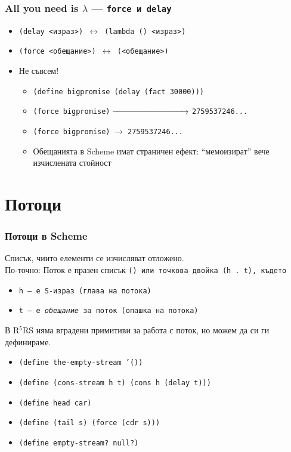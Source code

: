 \documentclass{beamer}
\begin{document}
\begin{frame}
  \frametitle{All you need is $\lambda$ --- \tt{force} и \tt{delay}}
  \begin{itemize}
  \item \tt{(delay }<израз>\tt) $\leftrightarrow$ \tt{(lambda () <израз>)}
  \item \tt{(force }<обещание>\tt) $\leftrightarrow$ \tt{(<обещание>)}\pause
  \item \alert{Не съвсем!} \pause
    \begin{itemize}[<.->]
    \item \tt{(define bigpromise (delay (fact 30000)))}
    \item \tt{(force bigpromise)}$\;\xrightarrow{\hspace*{3cm}}\;$\tt{2759537246...}
    \item \tt{(force bigpromise)}$\;\rightarrow\;$\tt{2759537246...} \pause
    \item Обещанията в Scheme имат страничен ефект: ``мемоизират'' вече изчислената стойност
    \end{itemize}
  \end{itemize}
\end{frame}

\section{Потоци}

\begin{frame}
  \frametitle{Потоци в Scheme}
  \begin{definition}[Поток]
    Списък, чиито елементи се изчисляват отложено. \\
    По-точно: Поток е празен списък \tt{()} или точкова двойка \tt{(h . t)}, където
      \begin{itemize}
      \item \tt h --- е S-израз (глава на потока)
      \item \tt t --- е \emph{обещание} за поток (опашка на потока)
      \end{itemize}
  \end{definition}
  \pause
  В R$^5$RS няма вградени примитиви за работа с поток, но можем да си ги дефинираме.
  \pause
  \begin{itemize}[<+->]
  \item \tt{(define the-empty-stream '())}
  \item \tt{(define (cons-stream h t) (cons h (delay t)))}
  \item \tt{(define head car)}
  \item \tt{(define (tail s) (force (cdr s)))}
  \item \tt{(define empty-stream? null?)}
  \end{itemize}
\end{frame}
\end{document}
